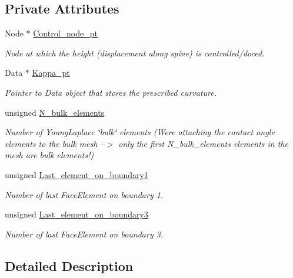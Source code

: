 \subsection*{Private Attributes}
\begin{DoxyCompactItemize}
\item 
Node $\ast$ \hyperlink{classYoungLaplaceProblem_a1d659f1b2d73140a5d52889f9581d12f}{Control\+\_\+node\+\_\+pt}
\begin{DoxyCompactList}\small\item\em Node at which the height (displacement along spine) is controlled/doced. \end{DoxyCompactList}\item 
Data $\ast$ \hyperlink{classYoungLaplaceProblem_a78d1ae3b73777674003b2c9794ea9b43}{Kappa\+\_\+pt}
\begin{DoxyCompactList}\small\item\em Pointer to Data object that stores the prescribed curvature. \end{DoxyCompactList}\item 
unsigned \hyperlink{classYoungLaplaceProblem_a4dc49a3807638823ac2157d67e8fed4a}{N\+\_\+bulk\+\_\+elements}
\begin{DoxyCompactList}\small\item\em Number of Young\+Laplace \char`\"{}bulk\char`\"{} elements (We\textquotesingle{}re attaching the contact angle elements to the bulk mesh --$>$ only the first N\+\_\+bulk\+\_\+elements elements in the mesh are bulk elements!) \end{DoxyCompactList}\item 
unsigned \hyperlink{classYoungLaplaceProblem_a30b767547f8b93461b56653dd007063a}{Last\+\_\+element\+\_\+on\+\_\+boundary1}
\begin{DoxyCompactList}\small\item\em Number of last Face\+Element on boundary 1. \end{DoxyCompactList}\item 
unsigned \hyperlink{classYoungLaplaceProblem_a5c9ac739e14a03c0dd36ff7407382814}{Last\+\_\+element\+\_\+on\+\_\+boundary3}
\begin{DoxyCompactList}\small\item\em Number of last Face\+Element on boundary 3. \end{DoxyCompactList}\end{DoxyCompactItemize}


\subsection{Detailed Description}
